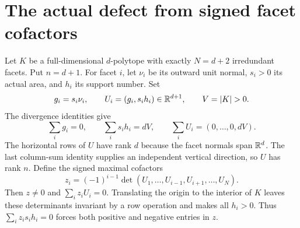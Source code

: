 \section{The actual defect from signed facet cofactors}\label{sec:cofactor}
Let $K$ be a full-dimensional $d$-polytope with exactly $N=d+2$
irredundant facets. Put $n=d+1$. For facet $i$, let $\nu_i$ be its outward
unit normal, $s_i>0$ its actual area, and $h_i$ its support number. Set
\[
 g_i=s_i\nu_i,\qquad U_i=(g_i,s_ih_i)\in\R^{d+1},\qquad V=|K|>0.
\]
The divergence identities give
\begin{equation}\label{eq:cofactor-sum}
 \sum_i g_i=0,\qquad \sum_i s_ih_i=dV,
 \qquad\sum_iU_i=(0,\ldots,0,dV).
\end{equation}
The horizontal rows of $U$ have rank $d$ because the facet normals span
$\mathbb R^d$. The last column-sum identity supplies an independent vertical
direction, so $U$ has rank $n$. Define the signed maximal cofactors
\begin{equation}\label{eq:cofactor-z}
 z_i=(-1)^{i-1}\det(U_1,\ldots,U_{i-1},U_{i+1},\ldots,U_N).
\end{equation}
Then $z\ne0$ and $\sum_i z_iU_i=0$. Translating the origin to the interior
of $K$ leaves these determinants invariant by a row operation and makes
all $h_i>0$. Thus $\sum_i z_is_ih_i=0$ forces both positive and negative
entries in $z$.

